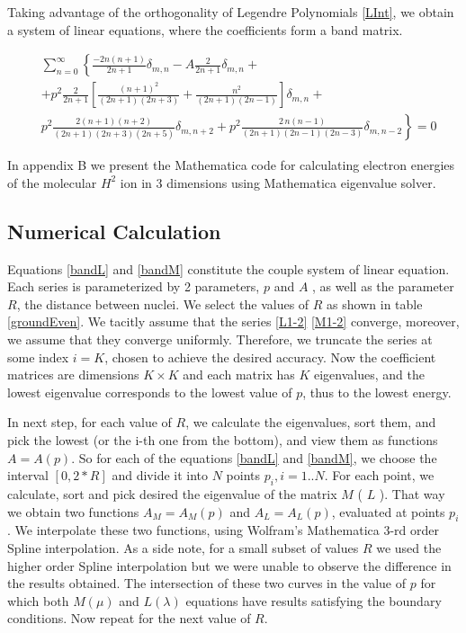 Taking advantage of the orthogonality of Legendre Polynomials \eqref{LInt}, we obtain a system of linear equations, where the coefficients form a band matrix.

\begin{equation}\label{bandM}
\begin{split}
& \sum_{n=0}^{\infty}\left\{\frac{-2n(n+1)}{2n+1}\delta_{m,n} - A\frac{2}{2n+1}\delta_{m,n} + \right.\\[.8em]
& \left. + p^2\frac{2}{2n+1} \left[ \frac{(n+1)^2}{(2n+1)(2n+3)} + \frac{n^2}{(2n+1)(2n-1)}\right]\delta_{m,n} + \right. \\[.8em] 
& \left.p^2\frac{2(n+1)(n+2)}{(2n+1)(2n+3)(2n+5)}\delta_{m,n+2} +p^2 \frac{2\,n(n-1)}{(2n+1)(2n-1)(2n-3)}\delta_{m,n-2} \right\} = 0
\end{split}
\end{equation}

In appendix B we present the Mathematica code for calculating electron energies of the molecular $ H^2 $ ion in 3 dimensions using Mathematica eigenvalue solver.

\subsection{Numerical Calculation}

Equations \eqref{bandL} and \eqref{bandM} constitute the couple system of linear equation. Each series is parameterized by 2 parameters, $ p $ and $ A $ , as well as the parameter $ R $, the distance between nuclei. We select the values of $ R $ as shown in table \ref{groundEven}. We tacitly assume that the series \eqref{L1-2} \eqref{M1-2} converge, moreover, we assume that they converge uniformly. Therefore, we truncate the series at some index $ i = K $, chosen to achieve the desired accuracy. Now the coefficient matrices are dimensions $ K \times K $ and each matrix has $ K $ eigenvalues, and the lowest eigenvalue corresponds to the lowest value of $ p $, thus to the lowest energy. 

 In next step, for each value of $ R $, we calculate the eigenvalues, sort them, and pick the lowest (or the i-th one from the bottom), and view them as functions $ A = A(p) $. So for each of the equations \eqref{bandL} and \eqref{bandM}, we choose the interval $\left[0, 2 * R \right] $ and divide it into $ N $ points $ p_{i}, i = 1..N $. For each point, we calculate, sort and pick desired the eigenvalue of the matrix $ M $ ( $ L $ ). That way we obtain two  functions $ A_{M} = A_{M}(p) $ and $ A_{L} = A_{L}(p) $, evaluated at points $ p_i $. We interpolate these two functions, using Wolfram's Mathematica 3-rd order Spline interpolation. 
As a side note, for a small subset of values $ R $ we used the higher order Spline interpolation but we were unable to observe the difference in the results obtained.
 The intersection of these two curves in the value of $ p $ for which both $ M(\mu) $ and $ L(\lambda) $ equations have results satisfying the boundary conditions. Now repeat for the next value of $ R $.

